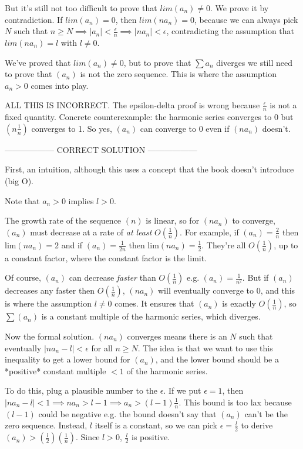 \documentclass{oxmathproblems}
\begin{document}
\begin{questions}
\begin{solution}
\begin{enumerate}[label=(\alph*)]
    But it's still not too difficult to prove that $lim(a_{n}) \neq 0$. We prove it by contradiction. If $lim(a_{n}) = 0$, then $lim(na_{n}) = 0$, because
    we can always pick $N$ such that $n \geq N \implies |a_{n}| < \frac{\epsilon}{n} \implies |na_{n}| < \epsilon$, contradicting the assumption that
    $lim(na_{n}) = l$ with $l \neq 0$.

    We've proved that $lim(a_{n}) \neq 0$, but to prove that $\sum a_{n}$ diverges we still need to prove that $(a_{n})$ is not the zero sequence.
    This is where the assumption $a_{n} > 0$ comes into play.

    ALL THIS IS INCORRECT. The epsilon-delta proof is wrong because $\frac{\epsilon}{n}$ is not a fixed quantity. Concrete counterexample: the harmonic series
    converges to 0 but $(n\frac{1}{n})$ converges to 1. So yes, $(a_{n})$ can converge to 0 even if $(na_{n})$ doesn't.

    ------------------ CORRECT SOLUTION ------------------

    First, an intuition, although this uses a concept that the book doesn't introduce (big O).

    Note that $a_{n} > 0$ implies $l > 0$.

    The growth rate of the sequence $(n)$ is linear, so for $(na_{n})$ to converge, $(a_{n})$ must decrease at a rate of \textit{at least} $O(\frac{1}{n})$.
    For example, if $(a_{n}) = \frac{2}{n}$ then lim$(na_{n})=2$ and if $(a_{n}) = \frac{1}{2n}$ then lim$(na_{n})=\frac{1}{2}$. They're all $O(\frac{1}{n})$,
    up to a constant factor, where the constant factor is the limit.
    
    Of course, $(a_{n})$ can decrease \textit{faster} than $O(\frac{1}{n})$ e.g. $(a_{n}) = \frac{1}{n^{2}}$. But if $(a_{n})$ decreases any faster then $O(\frac{1}{n})$,
    $(na_{n})$ will eventually converge to 0, and this is where the assumption $l \neq 0$ comes. It ensures that $(a_{n})$ is exactly $O(\frac{1}{n})$, so $\sum (a_{n})$ is
    a constant multiple of the harmonic series, which diverges.

    Now the formal solution. $(na_{n})$ converges means there is an $N$ such that eventually $|na_{n} - l| < \epsilon$ for all $n \geq N$. The idea is that we want to use
    this inequality to get a lower bound for $(a_{n})$, and the lower bound should be a *positive* constant multiple $< 1$ of the harmonic series.
    
    To do this, plug a plausible number to
    the $\epsilon$. If we put $\epsilon = 1$, then $|na_{n} - l| < 1 \implies na_{n} > l-1 \implies a_{n} > (l-1)\frac{1}{n}$. This bound is too lax because $(l-1)$ could be negative e.g.
    the bound doesn't say that $(a_{n})$ can't be the zero sequence.
    Instead, $l$ itself is a constant, so we can pick $\epsilon = \frac{l}{2}$ to derive $(a_{n}) > (\frac{l}{2})(\frac{1}{n})$. Since $l > 0$, $\frac{l}{2}$ is positive.
    

\end{enumerate}
\end{solution}
\end{questions}
\end{document}
